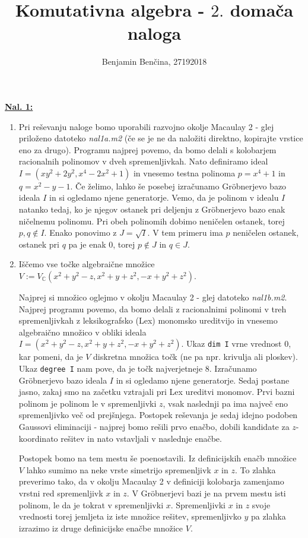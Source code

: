 \documentclass[a4paper, 12pt]{article} %
\title{Komutativna algebra - $2.$ domača naloga}
\author{Benjamin Benčina, 27192018}
\newcommand{\C}{\mathbb{C}}
\begin{document}
\maketitle

\underline{\textbf{Nal. 1:}}
\begin{enumerate}[label=(\alph*)]
	\item Pri reševanju naloge bomo uporabili razvojno okolje Macaulay 2 - glej priloženo datoteko \textit{nal1a.m2} (če se je ne da naložiti direktno, kopirajte vrstice eno za drugo). Programu najprej povemo, da bomo delali s kolobarjem racionalnih polinomov v dveh spremenljivkah. Nato definiramo ideal $I = (xy^2 + 2y^2, x^4 - 2x^2 + 1)$ in vnesemo testna polinoma $p = x^4 + 1$ in $q = x^2 - y - 1$. Če želimo, lahko še posebej izračunamo Gr\"obnerjevo bazo ideala $I$ in si ogledamo njene generatorje. Vemo, da je polinom v idealu $I$ natanko tedaj, ko je njegov ostanek pri deljenju z Gr\"obnerjevo bazo enak ničelnemu polinomu. Pri obeh polinomih dobimo neničelen ostanek, torej $p,q \notin I$.
	Enako ponovimo z $J = \sqrt{I}$. V tem primeru ima $p$ neničelen ostanek, ostanek pri $q$ pa je enak $0$, torej $p \notin J$ in $q \in J$.
	\item Iščemo vse točke algebraične množice $V := V_\C(x^2 + y^2  - z, x^2 + y + z^2, -x + y^2 + z^2)$.
	
	Najprej si množico oglejmo v okolju Macaulay 2 - glej datoteko \textit{nal1b.m2}. Najprej programu povemo, da bomo delali z racionalnimi polinomi v treh spremenljivkah z leksikografsko (Lex) monomsko ureditvijo in vnesemo algebraično množico v obliki ideala $I = (x^2 + y^2  - z, x^2 + y + z^2, -x + y^2 + z^2)$. Ukaz \texttt{dim I} vrne vrednost $0$, kar pomeni, da je $V$ diskretna množica točk (ne pa npr. krivulja ali ploskev). Ukaz \texttt{degree I} nam pove, da je točk najverjetneje $8$. Izračunamo Gr\"obnerjevo bazo ideala $I$ in si ogledamo njene generatorje. Sedaj postane jasno, zakaj smo na začetku vztrajali pri Lex ureditvi monomov. Prvi bazni polinom je polinom le v spremenljivki $z$, vsak naslednji pa ima največ eno spremenljivko več od prejšnjega. Postopek reševanja je sedaj idejno podoben Gaussovi eliminaciji - najprej bomo rešili prvo enačbo, dobili kandidate za $z$-koordinato rešitev in nato vstavljali v naslednje enačbe.
	
	Postopek bomo na tem mestu še poenostavili. Iz definicijskih enačb množice $V$ lahko sumimo na neke vrste simetrijo spremenljivk $x$ in $z$. To zlahka preverimo tako, da v okolju Macaulay 2 v definiciji kolobarja zamenjamo vrstni red spremenljivk $x$ in $z$. V Gr\"obnerjevi bazi je na prvem mestu isti polinom, le da je tokrat v spremenljivki $x$. Spremenljivki $x$ in $z$ svoje vrednosti torej jemljeta iz iste množice rešitev, spremenljivko $y$ pa zlahka izrazimo iz druge definicijske enačbe množice $V$.
	

\end{enumerate}
\end{document}
